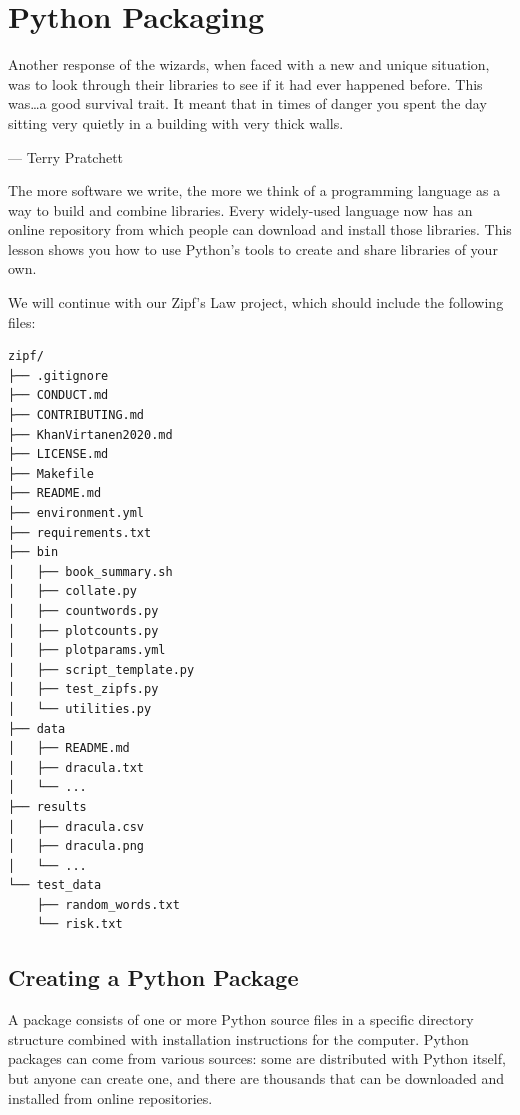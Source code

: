 \documentclass[
]{krantz}
\renewenvironment{quote}{\begin{VF}}{\end{VF}}
\begin{document}
\hypertarget{packaging}{%
\chapter{Python Packaging}\label{packaging}}

\begin{quote}
Another response of the wizards,
when faced with a new and unique situation,
was to look through their libraries to see if it had ever happened before.
This was\ldots a good survival trait.
It meant that in times of danger you spent the day sitting very quietly
in a building with very thick walls.

--- Terry Pratchett
\end{quote}

The more software we write,
the more we think of a programming language as a way to build and combine libraries.
Every widely-used language now has an online repository
from which people can download and install those libraries.
This lesson shows you how to use Python's tools to create and share libraries of your own.

We will continue with our Zipf's Law project,
which should include the following files:

\begin{verbatim}
zipf/
├── .gitignore
├── CONDUCT.md
├── CONTRIBUTING.md
├── KhanVirtanen2020.md
├── LICENSE.md
├── Makefile
├── README.md
├── environment.yml
├── requirements.txt
├── bin
│   ├── book_summary.sh
│   ├── collate.py
│   ├── countwords.py
│   ├── plotcounts.py
│   ├── plotparams.yml
│   ├── script_template.py
│   ├── test_zipfs.py
│   └── utilities.py
├── data
│   ├── README.md
│   ├── dracula.txt
│   └── ...
├── results
│   ├── dracula.csv
│   ├── dracula.png
│   └── ...
└── test_data
    ├── random_words.txt
    └── risk.txt
\end{verbatim}

\hypertarget{packaging-package}{%
\section{Creating a Python Package}\label{packaging-package}}

A package consists of one or more Python source files
in a specific directory structure
combined with installation instructions for the computer.
Python packages can come from various sources:
some are distributed with Python itself,
but anyone can create one,
and there are thousands that can be downloaded and installed from online repositories.
\end{document}
